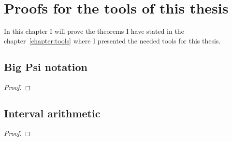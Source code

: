 \chapter{Proofs for the tools of this thesis}

In this chapter I will prove the theorems I have stated in the chapter~\ref{chapter:tools} where I presented the needed tools for this thesis.

\section{Big Psi notation}

\begin{theorem}

\end{theorem}

\begin{proof}

\end{proof}

\section{Interval arithmetic}

\begin{theorem}

\end{theorem}

\begin{proof}

\end{proof}
